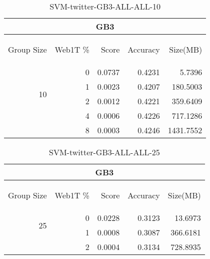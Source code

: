 \begin{center}
\begin{table}[htbp] 
 \begin{center}
\begin{tabular}{ | r | r | r | r | r |}
\hline
\multicolumn{5}{|c|}{GB3}\\
\hline
\begin{sideways}Group Size\end{sideways} & \begin{sideways}Web1T \%\end{sideways} & \begin{sideways}Score\end{sideways} & \begin{sideways}Accuracy\end{sideways} & \begin{sideways}Size(MB)\end{sideways}\\
\hline
\multirow{4}{*}{10}
 & 0 & 0.0737 & 0.4231 & 5.7396\\ \cline{2-5}
 & 1 & 0.0023 & 0.4207 & 180.5003\\ \cline{2-5}
 & 2 & 0.0012 & 0.4221 & 359.6409\\ \cline{2-5}
 & 4 & 0.0006 & 0.4226 & 717.1286\\ \cline{2-5}
 & 8 & 0.0003 & 0.4246 & 1431.7552\\ \cline{2-5}
\hline
\end{tabular}
\caption{SVM-twitter-GB3-ALL-ALL-10}
\label{table:SVM-twitter-GB3-ALL-ALL-10}
\end{center}
 \end{table}
\end{center}

\begin{center}
\begin{table}[htbp] 
 \begin{center}
\begin{tabular}{ | r | r | r | r | r |}
\hline
\multicolumn{5}{|c|}{GB3}\\
\hline
\begin{sideways}Group Size\end{sideways} & \begin{sideways}Web1T \%\end{sideways} & \begin{sideways}Score\end{sideways} & \begin{sideways}Accuracy\end{sideways} & \begin{sideways}Size(MB)\end{sideways}\\
\hline
\multirow{2}{*}{25}
 & 0 & 0.0228 & 0.3123 & 13.6973\\ \cline{2-5}
 & 1 & 0.0008 & 0.3087 & 366.6181\\ \cline{2-5}
 & 2 & 0.0004 & 0.3134 & 728.8935\\ \cline{2-5}
\hline
\end{tabular}
\caption{SVM-twitter-GB3-ALL-ALL-25}
\label{table:SVM-twitter-GB3-ALL-ALL-25}
\end{center}
 \end{table}
\end{center}

